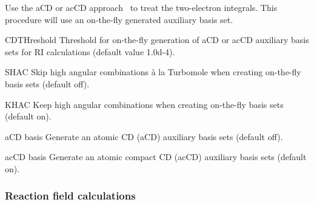 \begin{keywordlist}
Use the aCD or acCD approach~\cite{Aquilante:07b} to treat the two-electron integrals.
This procedure will use an on-the-fly generated auxiliary basis set.
\item[CDTHreshold]
Threshold for on-the-fly generation of aCD or acCD auxiliary basis sets for RI calculations
(default value 1.0d-4).
\item[SHAC]
Skip high angular combinations \`a la Turbomole when creating on-the-fly basis sets
(default off).
\item[KHAC]
Keep high angular combinations when creating on-the-fly basis sets
(default on).
\item[aCD basis]
Generate an atomic CD (aCD) auxiliary basis sets (default off).
\item[acCD basis]
Generate an atomic compact CD (acCD) auxiliary basis sets (default on).
\end{keywordlist}

\subsubsection{Reaction field calculations}
\label{UG:sec:rfield}

